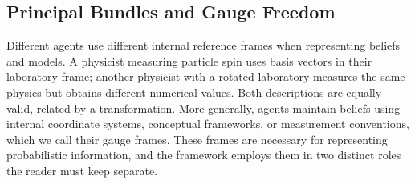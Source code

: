 \documentclass[11pt]{article}
\begin{document}
\subsection{Principal Bundles and Gauge Freedom}
\label{sec:agents_as_sections}

Different agents use different internal reference frames when representing beliefs and models. A physicist measuring particle spin uses basis vectors in their laboratory frame; another physicist with a rotated laboratory measures the same physics but obtains different numerical values. Both descriptions are equally valid, related by a transformation. More generally, agents maintain beliefs using internal coordinate systems, conceptual frameworks, or measurement conventions, which we call their gauge frames. These frames are necessary for representing probabilistic information, and the framework employs them in two distinct roles the reader must keep separate.
\end{document}
